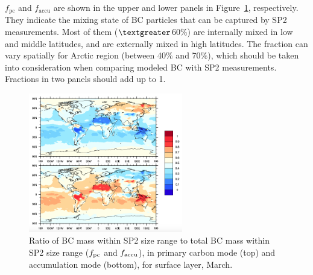 \documentclass[11pt]{article}
\begin{document}
	$f_{\text{pc}}$ and $f_{\text{accu}}$ are shown in the upper
	and lower panels in Figure~\ref{fig_P3}, respectively. They indicate the mixing state of BC particles
	that can be captured by SP2 measurements. Most of them
	($\textgreater$60$\%$) are internally mixed in low and middle
	latitudes, and are externally mixed in high latitudes. The fraction
	can vary spatially for Arctic region (between 40$\%$ and 70$\%$),
	which should be taken into consideration when comparing modeled BC
	with SP2 measurements. Fractions in two panels should add up to 1.
	
	
	\begin{figure}[!h] 
		\begin{center}
			\includegraphics[width = 0.6\textwidth]{Rplot03}
			\caption[]{\label{fig_P3} Ratio of BC mass within SP2 size range to total BC mass within SP2 size range ($f_{\rm pc}$ and $f_{\rm accu}$), in primary carbon mode (top) and accumulation mode (bottom), for surface layer, March.}
		\end{center}
	\end{figure}
	
	
	
	
	
	\clearpage
	
	
	
	
	
	
	
	
	
	
	
	
\end{document}
